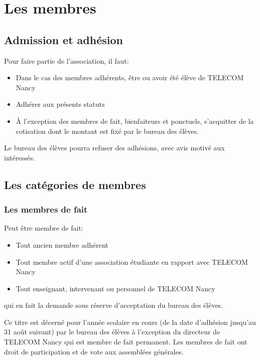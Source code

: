 \documentclass{article}
\begin{document}
	\section{Les membres}
\label{sec:les_membres}
	
		\subsection{Admission et adhésion}
\label{sub:admission_et_adhesion}
		
			Pour faire partie de l'association, il faut:
			\begin{itemize}
				\item Dans le cas des membres adhérents, être ou avoir été élève
					de TELECOM Nancy
				\item Adhérer aux présents statuts
				\item À l’exception des membres de fait, bienfaiteurs et
					ponctuels, s'acquitter de la cotisation dont le montant est
					fixé par le bureau des élèves.
			\end{itemize}

			Le bureau des élèves pourra refuser des adhésions, avec avis motivé
			aux intéressés.

		\subsection{Les catégories de membres}
\label{sub:les_categories_de_membres}
			\subsubsection{Les membres de fait}
\label{ssub:les_membres_de_fait}
				Peut être membre de fait:
				\begin{itemize}
					\item Tout ancien membre adhérent
					\item Tout membre actif d’une association étudiante en
						rapport avec TELECOM Nancy
					\item Tout enseignant, intervenant ou personnel de TELECOM
						Nancy
				\end{itemize}
				qui en fait la demande sous réserve d’acceptation du bureau des
				élèves.

				Ce titre est décerné pour l’année scolaire en cours (de la date
				d’adhésion jusqu’au 31 août suivant) par le bureau des élèves à
				l’exception du directeur de TELECOM Nancy qui est membre de fait
				permanent. Les membres de fait ont droit de participation et de
				vote aux assemblées générales.
\end{document}
